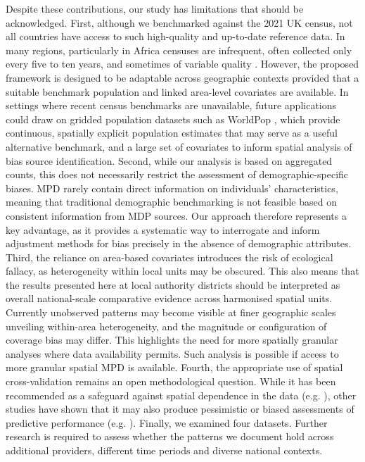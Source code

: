 \documentclass[]{rsos}%
\begin{document}
Despite these contributions, our study has limitations that should be
acknowledged. First, although we benchmarked against the 2021 UK census,
not all countries have access to such high-quality and up-to-date
reference data. In many regions, particularly in Africa censuses are
infrequent, often collected only every five to ten years, and sometimes
of variable quality \citep{dindi2025}. However, the proposed framework is
designed to be adaptable across geographic contexts provided that a
suitable benchmark population and linked area-level covariates are
available. In settings where recent census benchmarks are unavailable,
future applications could draw on gridded population datasets such as
WorldPop \citep{tatem2017}, which provide continuous, spatially explicit
population estimates that may serve as a useful alternative benchmark,
and a large set of covariates to inform spatial analysis of bias source
identification. Second, while our analysis is based on aggregated
counts, this does not necessarily restrict the assessment of
demographic-specific biases. MPD rarely contain direct information on
individuals' characteristics, meaning that traditional demographic
benchmarking is not feasible based on consistent information from MDP
sources. Our approach therefore represents a key advantage, as it
provides a systematic way to interrogate and inform adjustment methods
for bias precisely in the absence of demographic attributes. Third, the
reliance on area-based covariates introduces the risk of ecological
fallacy, as heterogeneity within local units may be obscured. This also
means that the results presented here at local authority districts
should be interpreted as overall national-scale comparative evidence
across harmonised spatial units. Currently unobserved patterns may
become visible at finer geographic scales unveiling within-area
heterogeneity, and the magnitude or configuration of coverage bias may
differ. This highlights the need for more spatially granular analyses
where data availability permits. Such analysis is possible if access to
more granular spatial MPD is available. Fourth, the appropriate use of
spatial cross-validation remains an open methodological question. While
it has been recommended as a safeguard against spatial dependence in the
data (e.g. \citep{roberts17}), other studies have shown that it may also
produce pessimistic or biased assessments of predictive performance
(e.g. \citep{Radoux21}). Finally, we examined four datasets. Further research
is required to assess whether the patterns we document hold across
additional providers, different time periods and diverse national
contexts.
\end{document}
